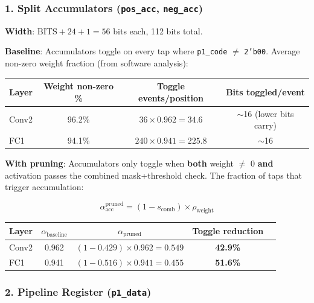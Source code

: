 \documentclass[11pt,a4paper]{article}
\begin{document}
\subsubsection{1. Split Accumulators (\texttt{pos\_acc}, \texttt{neg\_acc})}

\noindent\textbf{Width}: $\text{BITS}+24+1 = 56$ bits each, 112 bits total.

\noindent\textbf{Baseline}: Accumulators toggle on every tap where \texttt{p1\_code} $\neq$ \texttt{2'b00}.
Average non-zero weight fraction (from software analysis):
\begin{center}
\begin{tabular}{lccc}
\toprule
\textbf{Layer} & \textbf{Weight non-zero \%} & \textbf{Toggle events/position} & \textbf{Bits toggled/event} \\
\midrule
Conv2 & 96.2\% & $36 \times 0.962 = 34.6$ & $\sim$16 (lower bits carry) \\
FC1   & 94.1\% & $240 \times 0.941 = 225.8$ & $\sim$16 \\
\bottomrule
\end{tabular}
\end{center}

\noindent\textbf{With pruning}: Accumulators only toggle when \textbf{both}
weight $\neq$ 0 \textbf{and} activation passes the combined mask+threshold
check.  The fraction of taps that trigger accumulation:

\begin{equation}
\alpha_{\text{acc}}^{\text{pruned}} = (1 - s_{\text{comb}}) \times \rho_{\text{weight}}
\end{equation}

\begin{center}
\begin{tabular}{lcccc}
\toprule
\textbf{Layer} & $\alpha_{\text{baseline}}$ & $\alpha_{\text{pruned}}$ & \textbf{Toggle reduction} \\
\midrule
Conv2 & 0.962 & $(1-0.429) \times 0.962 = 0.549$ & \textbf{42.9\%} \\
FC1   & 0.941 & $(1-0.516) \times 0.941 = 0.455$ & \textbf{51.6\%} \\
\bottomrule
\end{tabular}
\end{center}

\subsubsection{2. Pipeline Register (\texttt{p1\_data})}
\end{document}
